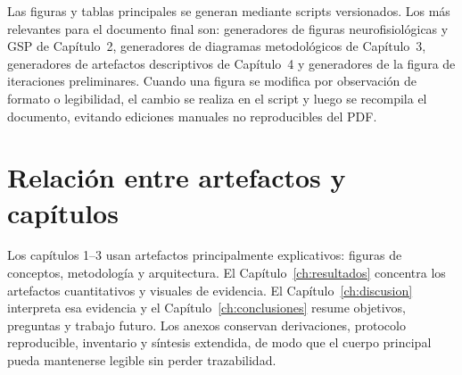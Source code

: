 Las figuras y tablas principales se generan mediante scripts versionados. Los más relevantes para el documento final son: generadores de figuras neurofisiológicas y GSP de Capítulo~2, generadores de diagramas metodológicos de Capítulo~3, generadores de artefactos descriptivos de Capítulo~4 y generadores de la figura de iteraciones preliminares. Cuando una figura se modifica por observación de formato o legibilidad, el cambio se realiza en el script y luego se recompila el documento, evitando ediciones manuales no reproducibles del PDF.

\section{Relación entre artefactos y capítulos}

Los capítulos 1--3 usan artefactos principalmente explicativos: figuras de conceptos, metodología y arquitectura. El Capítulo~\ref{ch:resultados} concentra los artefactos cuantitativos y visuales de evidencia. El Capítulo~\ref{ch:discusion} interpreta esa evidencia y el Capítulo~\ref{ch:conclusiones} resume objetivos, preguntas y trabajo futuro. Los anexos conservan derivaciones, protocolo reproducible, inventario y síntesis extendida, de modo que el cuerpo principal pueda mantenerse legible sin perder trazabilidad.
